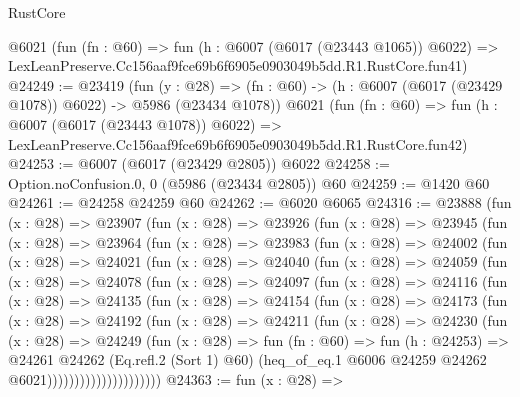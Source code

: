 \begin{lexlean}{RustCore}
\begin{coremodule}
    @6021
    (fun (fn : @60) =>
    fun (h : @6007 (@6017 (@23443 @1065)) @6022) =>
    LexLeanPreserve.Cc156aaf9fce69b6f6905e0903049b5dd.R1.RustCore.fun41)
@24249 := @23419
    (fun (y : @28) =>
    (fn : @60) -> (h : @6007 (@6017 (@23429 @1078)) @6022) -> @5986 (@23434 @1078))
    @6021
    (fun (fn : @60) =>
    fun (h : @6007 (@6017 (@23443 @1078)) @6022) =>
    LexLeanPreserve.Cc156aaf9fce69b6f6905e0903049b5dd.R1.RustCore.fun42)
@24253 := @6007 (@6017 (@23429 @2805)) @6022
@24258 := Option.noConfusion.{0, 0} (@5986 (@23434 @2805)) @60
@24259 := @1420 @60
@24261 := @24258 @24259 @60
@24262 := @6020 @6065
@24316 := @23888
    (fun (x : @28) =>
    @23907
      (fun (x : @28) =>
      @23926
        (fun (x : @28) =>
        @23945
          (fun (x : @28) =>
          @23964
            (fun (x : @28) =>
            @23983
              (fun (x : @28) =>
              @24002
                (fun (x : @28) =>
                @24021
                  (fun (x : @28) =>
                  @24040
                    (fun (x : @28) =>
                    @24059
                      (fun (x : @28) =>
                      @24078
                        (fun (x : @28) =>
                        @24097
                          (fun (x : @28) =>
                          @24116
                            (fun (x : @28) =>
                            @24135
                              (fun (x : @28) =>
                              @24154
                                (fun (x : @28) =>
                                @24173
                                  (fun (x : @28) =>
                                  @24192
                                    (fun (x : @28) =>
                                    @24211
                                      (fun (x : @28) =>
                                      @24230
                                        (fun (x : @28) =>
                                        @24249
                                          (fun (x : @28) =>
                                          fun (fn : @60) =>
                                          fun (h : @24253) =>
                                          @24261
                                            @24262
                                            (Eq.refl.{2} (Sort 1) @60)
                                            (heq_of_eq.{1}
                                              @6006
                                              @24259
                                              @24262
                                              @6021)))))))))))))))))))))
@24363 := fun (x : @28) =>

\end{coremodule}
\end{lexlean}
